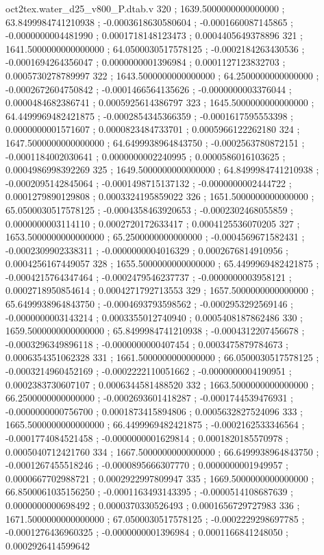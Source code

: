 \begin{filecontents}[overwrite]{oct2tex.water_d25_v800_P.dtab.v}
320 ; 1639.5000000000000000 ; 63.8499984741210938 ; -0.0003618630580604 ; -0.0001660087145865 ; -0.0000000004481990 ; 0.0001718148123473 ; 0.0004405649378896
321 ; 1641.5000000000000000 ; 64.0500030517578125 ; -0.0002184263430536 ; -0.0001694264356047 ; 0.0000000001396984 ; 0.0001127123832703 ; 0.0005730278789997
322 ; 1643.5000000000000000 ; 64.2500000000000000 ; -0.0002672604750842 ; -0.0001466564135626 ; -0.0000000003376044 ; 0.0000484682386741 ; 0.0005925614386797
323 ; 1645.5000000000000000 ; 64.4499969482421875 ; -0.0002854345366359 ; -0.0001617595553398 ; 0.0000000001571607 ; 0.0000823484733701 ; 0.0005966122262180
324 ; 1647.5000000000000000 ; 64.6499938964843750 ; -0.0002563780872151 ; -0.0001184002030641 ; 0.0000000002240995 ; 0.0000586016103625 ; 0.0004986998392269
325 ; 1649.5000000000000000 ; 64.8499984741210938 ; -0.0002095142845064 ; -0.0001498715137132 ; -0.0000000002444722 ; 0.0001279890129808 ; 0.0003324195859022
326 ; 1651.5000000000000000 ; 65.0500030517578125 ; -0.0004358463920653 ; -0.0002302468055859 ; 0.0000000003114110 ; 0.0002720172633417 ; 0.0004125536070205
327 ; 1653.5000000000000000 ; 65.2500000000000000 ; -0.0004569671582431 ; -0.0002309902338311 ; -0.0000000004016329 ; 0.0002676814910956 ; 0.0004256167449057
328 ; 1655.5000000000000000 ; 65.4499969482421875 ; -0.0004215764347464 ; -0.0002479546237737 ; -0.0000000003958121 ; 0.0002718950854614 ; 0.0004271792713553
329 ; 1657.5000000000000000 ; 65.6499938964843750 ; -0.0004693793598562 ; -0.0002953292569146 ; -0.0000000003143214 ; 0.0003355012740940 ; 0.0005408187862486
330 ; 1659.5000000000000000 ; 65.8499984741210938 ; -0.0004312207456678 ; -0.0003296349896118 ; -0.0000000000407454 ; 0.0003475879784673 ; 0.0006354351062328
331 ; 1661.5000000000000000 ; 66.0500030517578125 ; -0.0003214960452169 ; -0.0002222110051662 ; -0.0000000004190951 ; 0.0002383730607107 ; 0.0006344581488520
332 ; 1663.5000000000000000 ; 66.2500000000000000 ; -0.0002693601418287 ; -0.0001744539476931 ; -0.0000000000756700 ; 0.0001873415894806 ; 0.0005632827524096
333 ; 1665.5000000000000000 ; 66.4499969482421875 ; -0.0002162533346564 ; -0.0001774084521458 ; -0.0000000001629814 ; 0.0001820185570978 ; 0.0005040712421760
334 ; 1667.5000000000000000 ; 66.6499938964843750 ; -0.0001267455518246 ; -0.0000895666307770 ; 0.0000000001949957 ; 0.0000667702988721 ; 0.0002922997809947
335 ; 1669.5000000000000000 ; 66.8500061035156250 ; -0.0001163493143395 ; -0.0000514108687639 ; 0.0000000000698492 ; 0.0000370330526493 ; 0.0001656729727983
336 ; 1671.5000000000000000 ; 67.0500030517578125 ; -0.0002229298697785 ; -0.0001276436960325 ; -0.0000000001396984 ; 0.0001166841248050 ; 0.0002926414599642

\end{filecontents}
